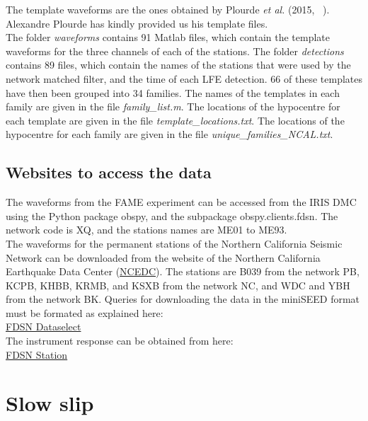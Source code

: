 \documentclass[main.tex]{subfiles}
\begin{document}
The template waveforms are the ones obtained by Plourde \textit{et al.} (2015, ~\cite{PLO_2015}). Alexandre Plourde has kindly provided us his template files. \\

The folder \textit{waveforms} contains 91 Matlab files, which contain the template waveforms for the three channels of each of the stations. The folder \textit{detections} contains 89 files, which contain the names of the stations that were used by the network matched filter, and the time of each LFE detection. 66 of these templates have then been grouped into 34 families. The names of the templates in each family are given in the file \textit{family\_list.m}. The locations of the hypocentre for each template are given in the file \textit{template\_locations.txt}. The locations of the hypocentre for each family are given in the file \textit{unique\_families\_NCAL.txt}.

\section{Websites to access the data}

The waveforms from the FAME experiment can be accessed from the IRIS DMC using the Python package obspy, and the subpackage obspy.clients.fdsn. The network code is XQ, and the stations names are ME01 to ME93. \\

The waveforms for the permanent stations of the Northern California Seismic Network can be downloaded from the website of the Northern California Earthquake Data Center (\href{http://ncedc.org/}{NCEDC}). The stations are B039 from the network PB, KCPB, KHBB, KRMB, and KSXB from the network NC, and WDC and YBH from the network BK. Queries for downloading the data in the miniSEED format must be formated as explained here: \\

\href{http://service.ncedc.org/fdsnws/dataselect/1/#description-box}{FDSN Dataselect} \\

The instrument response can be obtained from here: \\

\href{http://service.ncedc.org/fdsnws/station/1/#description-box}{FDSN Station}

\chapter{Slow slip}
\end{document}
